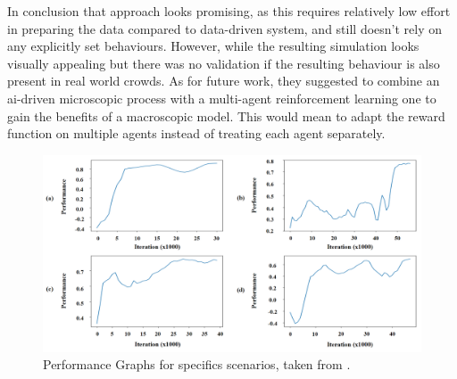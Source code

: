 \documentclass{acmsiggraph}               %
\begin{document}
In conclusion that approach looks promising, as this requires relatively low effort in preparing the data compared to data-driven system, and still doesn't rely on any explicitly set behaviours. However, while the resulting simulation looks visually appealing but there was no validation if the resulting behaviour is also present in real world crowds. As for future work, they suggested to combine an ai-driven microscopic process with a multi-agent reinforcement learning one to gain the benefits of a macroscopic model. This would mean to adapt the reward function on multiple agents instead of treating each agent separately.  

\begin{figure}
  \centering
  \includegraphics[width=1\linewidth]{images/aiPerformance.png}
  \caption{Performance Graphs for specifics scenarios, taken from \protect\cite{lee_crowd_2018}.}
  \label{fig:aiPerformance}
\end{figure}
\end{document}
